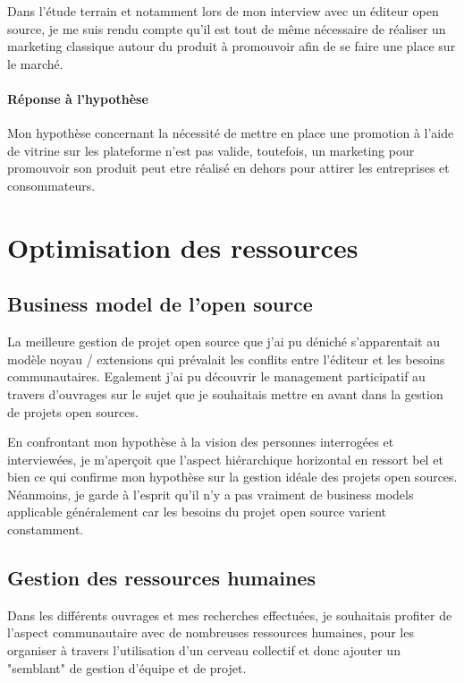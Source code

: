 		Dans l'étude terrain et notamment lors de mon interview avec un éditeur open source, je me suis rendu compte qu'il est tout de même nécessaire de réaliser un marketing classique autour du produit à promouvoir afin de se faire une place sur le marché.

\paragraph{Réponse à l'hypothèse\\}

	Mon hypothèse concernant la nécessité de mettre en place une promotion à l'aide de vitrine sur les plateforme n'est pas valide, toutefois, un marketing pour promouvoir son produit peut etre réalisé en dehors pour attirer les entreprises et consommateurs.

\section{Optimisation des ressources}

	\subsection{Business model de l'open source}

		La meilleure gestion de projet open source que j'ai pu déniché s'apparentait au modèle noyau / extensions qui prévalait les conflits entre l'éditeur et les besoins communautaires. Egalement j'ai pu découvrir le management participatif au travers d'ouvrages sur le sujet que je souhaitais mettre en avant dans la gestion de projets open sources.

		En confrontant mon hypothèse à la vision des personnes interrogées et interviewées, je m'aperçoit que l'aspect hiérarchique horizontal en ressort bel et bien ce qui confirme mon hypothèse sur la gestion idéale des projets open sources. \\

		Néanmoins, je garde à l'esprit qu'il n'y a pas vraiment de business models applicable généralement car les besoins du projet open source varient constamment.

	\subsection{Gestion des ressources humaines}

		Dans les différents ouvrages et mes recherches effectuées, je souhaitais profiter de l'aspect communautaire avec de nombreuses ressources humaines, pour les organiser à travers l'utilisation d'un cerveau collectif et donc ajouter un "semblant" de gestion d'équipe et de projet.\\

